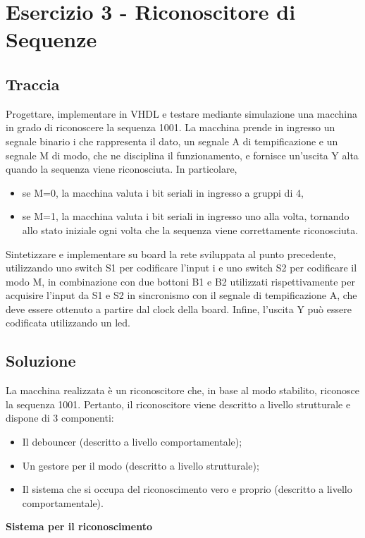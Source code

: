 \documentclass[12pt]{article}
\begin{document}
\section{Esercizio 3 - Riconoscitore di Sequenze}
\subsection{Traccia}
Progettare, implementare in VHDL e testare mediante simulazione una macchina in grado di riconoscere la sequenza 1001. La macchina prende in ingresso un segnale binario i che rappresenta il dato, un segnale A di tempificazione e un segnale M di modo, che ne disciplina il funzionamento, e fornisce un’uscita Y alta quando la sequenza viene riconosciuta. In particolare,
\begin{itemize}
    \item se M=0, la macchina valuta i bit seriali in ingresso a gruppi di 4,
    \item se M=1, la macchina valuta i bit seriali in ingresso uno alla volta, tornando allo stato iniziale ogni volta che la sequenza viene correttamente riconosciuta.
\end{itemize}
Sintetizzare e implementare su board la rete sviluppata al punto precedente, utilizzando uno switch S1 per codificare l’input i e uno switch S2 per codificare il modo M, in combinazione con due bottoni B1 e B2 utilizzati rispettivamente per acquisire l’input da S1 e S2 in sincronismo con il segnale di tempificazione A, che deve essere ottenuto a partire dal clock della board. Infine, l’uscita Y può essere codificata utilizzando un led.
\subsection{Soluzione}

La macchina realizzata è un riconoscitore che, in base al modo stabilito, riconosce la sequenza 1001. Pertanto, il riconoscitore viene descritto a livello strutturale e dispone di 3 componenti:
\begin{itemize}
    \item Il debouncer (descritto a livello comportamentale);
    \item Un gestore per il modo (descritto a livello strutturale);
    \item Il sistema che si occupa del riconoscimento vero e proprio (descritto a livello comportamentale).
\end{itemize}
\newpage
{\large \textbf{Sistema per il riconoscimento}}
\end{document}

